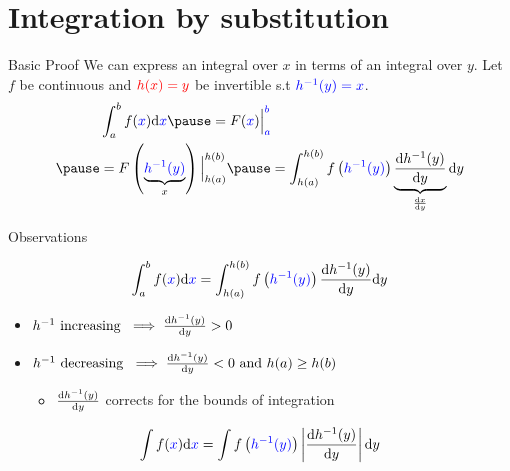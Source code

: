 \documentclass[14pt, aspectratio=169]{beamer}
\begin{document}
\section{Integration by substitution}
\frame{\tableofcontents[currentsection]}

\begin{frame}{Basic Proof}
We can express an integral over $ x $ in terms of an integral over $ y $. Let $ f $ be continuous and $ \textcolor{red}{h(x) = y} $ be invertible s.t
$ \textcolor{blue}{h^{-1}(y) = x} $. 
\begin{equation*}
\begin{aligned}
&\int_{a}^{b} f(\textcolor{blue}{x}) \dd \textcolor{blue}{x}  \pause = F(\textcolor{blue}{x})\Big|_{\textcolor{blue}{a}}^{\textcolor{blue}{b}} \\ \pause 
&= F\left(\underbrace{\textcolor{blue}{h^{-1}(y)}}_{x}\right)\Big|_{h(a)}^{h(b)} \pause = \int_{h(a)}^{h(b)} f\left(\textcolor{blue}{h^{-1}(y)}\right) \underbrace{\dv{h^{-1}(y)}{y}}_{\dv{x}{y}} \dd y 
\end{aligned}
\end{equation*}
\end{frame}

\begin{frame}{Observations}
\begin{small}
\begin{equation*}
\int_{a}^{b} f(\textcolor{blue}{x}) \dd \textcolor{blue}{x} = \int_{h(a)}^{h(b)} f\left(\textcolor{blue}{h^{-1}(y)}\right)\dv{h^{-1}(y)}{y} \dd y
\end{equation*}
\begin{itemize}
\item $ h^{-1} \text{ increasing } \implies \dv{h^{-1}(y)}{y} > 0 $
\pause
\item $ h^{-1} \text{ decreasing } \implies \dv{h^{-1}(y)}{y} < 0 \text{ and } h(a) \geq h(b) $
\begin{itemize}
\pause
\item $ \dv{h^{-1}(y)}{y} $ corrects for the bounds of integration
\end{itemize}
\end{itemize}
\begin{equation*}
\int f(\textcolor{blue}{x}) \dd \textcolor{blue}{x} = \int f\left(\textcolor{blue}{h^{-1}(y)}\right)\left|\dv{h^{-1}(y)}{y}\right| \dd y
\end{equation*}
\end{small}
\end{frame}
\end{document}
